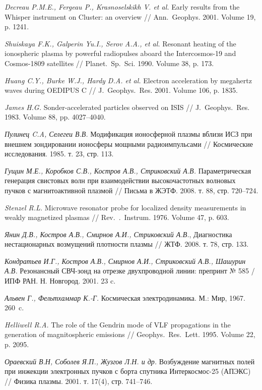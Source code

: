 \documentclass[autoref,10pt]{disser}
\begin{document}
\begin{thebibliography}{99}
\textit{Decreau P.M.E., Fergeau P., Krasnoselskikh V. et al.} Early results from the Whisper instrument on Cluster: an overview // Ann.~Geophys. 2001. Volume 19, p. 1241. %

\textit{Shuiskaya F.K., Galperin Yu.I., Serov A.A., et al.} Resonant heating of the ionospheric plasma by powerful radiopulses aboard the Intercosmos-19 and Cosmos-1809 satellites // Planet.~Sp.~Sci. 1990. Volume 38, p. 173. %

\textit{Huang C.Y., Burke W.J., Hardy D.A. et al.} Electron acceleration by megahertz waves during OEDIPUS C // J.~Geophys.~Res. 2001. Volume 106, p. 1835. %

\textit{James H.G.} Sonder-accelerated particles observed on ISIS // J.~Geophys.~Res. 1983. Volume 88, pp. 4027--4040. %

\textit{Пулинец C.A, Селегеи В.В.} Модификация ионосферной плазмы вблизи ИСЗ при внешнем зондировании ионосферы мощными радиоимпульсами // Космические исследования. 1985. т. 23, стр. 113.

\textit{Гущин М.Е., Коробков С.В., Костров А.В., Стриковский А.В.} 
Параметрическая генерация свистовых волн при взаимодействии высокочастотных волновых пучков с магнитоактивной плазмой // Письма в ЖЭТФ. 2008. т. 88, стр. 720--724.

\textit{Stenzel R.L.} Microwave resonator probe for localized density measurements in weakly magnetized plasmas // Rev.~.~Instrum. 1976. Volume 47, p. 603.

\textit{Янин Д.В., Костров А.В., Смирнов А.И., Стриковский А.В.}, Диагностика нестационарных возмущений плотности плазмы // ЖТФ. 2008. т. 78, стр. 133.

\textit{Кондратьев И.Г., Костров А.В., Смирнов А.И., Стриковский А.В., Шашурин А.В.} Резонансный СВЧ-зонд  на отрезке двухпроводной линии: препринт № 585 / ИПФ РАН. Н. Новгород. 2001. 23 c.

\textit{Альвен Г., Фельтхаммар К.-Г.} Космическая электродинамика. М.: Мир, 1967. 260~c.

\textit{Helliwell R.A.} The role of the Gendrin mode of VLF propagations in the generation of magnitospheric emissions // Geophys.~Res.~Lett. 1995. Volume 22, p. 2095. %

\textit{Ораевский В.Н, Соболев Я.П., Жузгов Л.Н. и др.} Возбуждение магнитных полей при инжекции электронных пучков с борта спутника Интеркосмос-25 (АПЭКС) // Физика плазмы. 2001. т. 17(4), стр. 741--746. %

\end{thebibliography}
\end{document}
